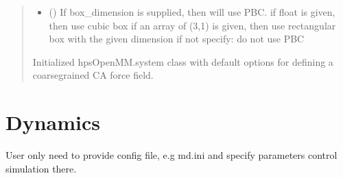 \documentclass[letterpaper,10pt,english]{sphinxmanual}
\begin{document}
\begin{fulllineitems}
\begin{fulllineitems}
\begin{quote}
\begin{description}
\begin{itemize}
\begin{description}
\begin{itemize}
\item {} 
\sphinxAtStartPar
’hps\_kr’: using Kapcha\sphinxhyphen{}Rossy scale.

\end{itemize}

\end{description}


\item {} 
\sphinxAtStartPar
{} (\sphinxstyleliteralemphasis{\sphinxupquote{ (}}\sphinxstyleliteralemphasis{\sphinxupquote{)}}) \textendash{} If box\_dimension is supplied, then will use PBC.
if float is given, then use cubic box
if an array of (3,1) is given, then use rectangular box with the given dimension
if not specify: do not use PBC

\end{itemize}

\sphinxAtStartPar
{} \textendash{} Initialized hpsOpenMM.system class with default options for defining
a coarse\sphinxhyphen{}grained CA force field.

\sphinxAtStartPar
{}

\end{description}\end{quote}

\end{fulllineitems}


\end{fulllineitems}


\sphinxstepscope


\chapter{Dynamics}
\label{\detokenize{modules/dynamics:dynamics}}\label{\detokenize{modules/dynamics::doc}}\begin{description}
\sphinxAtStartPar
User only need to provide config file, e.g md.ini and specify parameters control simulation there.

\end{description}
\end{document}
